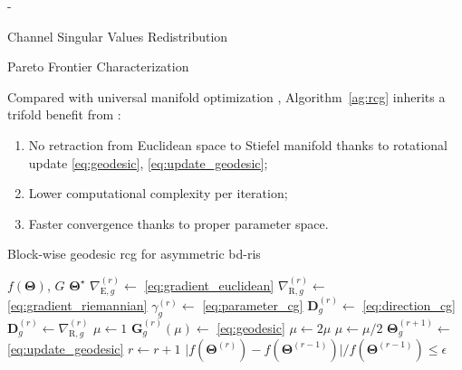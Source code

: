 \begin{section}{-}
\begin{subsection}{Channel Singular Values Redistribution}
\begin{subsubsection}{Pareto Frontier Characterization}
			\begin{remark}
				Compared with universal manifold optimization \cite{Absil2009,Pan2022d}, Algorithm~\ref{ag:rcg} inherits a trifold benefit from \cite{Abrudan2008,Abrudan2009}:
				\begin{enumerate}
					\item No retraction from Euclidean space to Stiefel manifold thanks to rotational update \eqref{eq:geodesic}, \eqref{eq:update_geodesic};
					\item Lower computational complexity per iteration;
					\item Faster convergence thanks to proper parameter space.
				\end{enumerate}
			\end{remark}

			\begin{algorithm}[!t]
				\caption{Block-wise geodesic \gls{rcg} for asymmetric \gls{bd}-\gls{ris}}
				\label{ag:rcg}
				\begin{algorithmic}[1]
					\Require $f(\mathbf{\Theta})$, $G$
					\Ensure $\mathbf{\Theta}^\star$
					\Repeat
							\State $\nabla_{\mathrm{E},g}^{(r)} \gets$ \eqref{eq:gradient_euclidean} \label{ln:gradient_euclidean}
							\State $\nabla_{\mathrm{R},g}^{(r)} \gets$ \eqref{eq:gradient_riemannian}
							\State $\gamma_g^{(r)} \gets$ \eqref{eq:parameter_cg}
							\State $\mathbf{D}_g^{(r)} \gets$ \eqref{eq:direction_cg}
							 
								\State $\mathbf{D}_g^{(r)} \gets \nabla_{\mathrm{R},g}^{(r)}$
							\EndIf
							\State $\mu \gets 1$
							\State $\mathbf{G}_g^{(r)}(\mu) \gets$ \eqref{eq:geodesic}
								\State $\mu \gets 2 \mu$
							\EndWhile
								\State $\mu \gets \mu / 2$
							\EndWhile
							\State $\mathbf{\Theta}_g^{(r+1)} \gets$ \eqref{eq:update_geodesic}
						\EndFor
						\State $r \gets r+1$
					\Until $\lvert f(\mathbf{\Theta}^{(r)}) - f(\mathbf{\Theta}^{(r-1)}) \rvert / f(\mathbf{\Theta}^{(r-1)}) \le \epsilon$
				\end{algorithmic}
			\end{algorithm}


\end{subsubsection}
\end{subsection}
\end{section}
